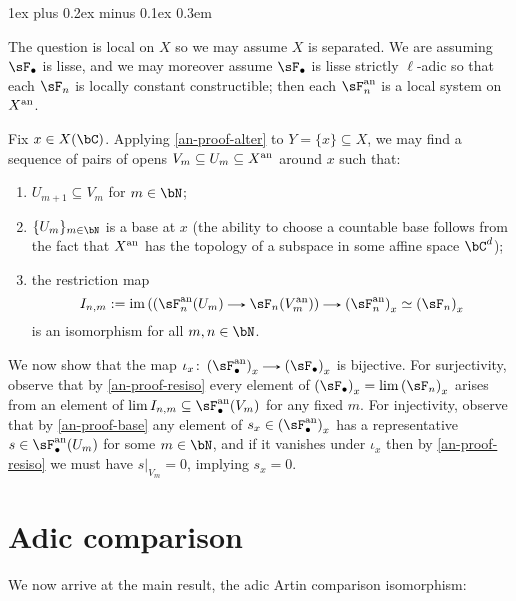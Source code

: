 \documentclass[11pt,leqno]{article}
\makeatletter
\newcommand{\thmheadfont}{\scshape}
\newcommand{\thmhorizspace}{0.3em}
\newcommand{\thmsep}{\hspace{\thmhorizspace}---}
\renewenvironment{proof}[1][Proof]{\par
  \pushQED{\qed}%
  \normalfont%
  \topsep1ex plus 0.2ex minus 0.1ex\relax%
  \labelsep \thmhorizspace\relax%
  \trivlist
  \item[\hskip\labelsep\thmheadfont#1\@addpunct{\thmsep}]\ignorespaces
}{%
  \popQED\endtrivlist\@endpefalse%
}
\theoremstyle{block}
\numberwithin{subblock}{block}
\numberwithin{equation}{subblock}
\newcommand{\arrlen}{1.25em}
\renewcommand{\to}{\mathrel{\tikz[baseline]%
    \draw[>=stealth,->](0,0.5ex)--(\arrlen,0.5ex);}}
\renewcommand{\l}{\left}
\renewcommand{\r}{\right}
\renewcommand{\c}{\colon}
\newcommand{\ce}{\mathrel{:=}}%
\newcommand{\iso}{\simeq}
\renewcommand{\im}{\operatorname{im}}
\numberwithin{block}{section}
\makeatother
\begin{document}
\begin{nothing}
  \begin{proof}[Proof of \cref{an-lim-stalk} for $\sF_\bullet$ lisse]
    The question is local on $X$ so we may assume $X$ is separated. We are assuming $\sF_\bullet$ is lisse, and we may moreover assume $\sF_\bullet$ is lisse strictly $\ell$-adic so that each $\sF_n$ is locally constant constructible; then each $\sF_n^\an$ is a local system on $X^{\mathrm{an}}$.

    Fix $x \in X(\bC)$. Applying \cref{an-proof-alter} to $Y = \{x\} \subseteq X$, we may find a sequence of pairs of opens $V_m \subseteq U_m \subseteq X^{\mathrm{an}}$ around $x$ such that:
    \begin{enumerate}
    \item $U_{m+1} \subseteq V_m$ for $m \in \bN$;
    \item \label{an-proof-base} $\{U_m\}_{m \in \bN}$ is a base at $x$ (the ability to choose a countable base follows from the fact that $X^{\mathrm{an}}$ has the topology of a subspace in some affine space $\bC^d$);
    \item \label{an-proof-resiso} the restriction map
      \[
        I_{n,m} \ce \im\l((\sF_n^\an(U_m) \to \sF_n(V_m^\an)\r) \to \l(\sF_n^\an\r)_x \iso \l(\sF_n\r)_x
      \]
      is an isomorphism for all $m,n \in \bN$.
    \end{enumerate}
    
    We now show that the map $\iota_x \c \l(\sF_\bullet^\an\r)_x \to \l(\sF_\bullet\r)_x$ is bijective. For surjectivity, observe that by \cref{an-proof-resiso} every element of $\l(\sF_\bullet\r)_x = \lim {\l(\sF_n\r)_x}$ arises from an element of $\lim I_{n,m} \subseteq \sF_\bullet^\an(V_m)$ for any fixed $m$. For injectivity, observe that by \cref{an-proof-base} any element of $s_x \in \l(\sF_\bullet^\an\r)_x$ has a representative $s \in \sF_\bullet^\an(U_m)$ for some $m \in \bN$, and if it vanishes under $\iota_x$ then by \cref{an-proof-resiso} we must have $s|_{V_m} = 0$, implying $s_x = 0$.
  \end{proof}
\end{nothing}


\section{Adic comparison}
\label{comp}

We now arrive at the main result, the adic Artin comparison isomorphism:
\end{document}
